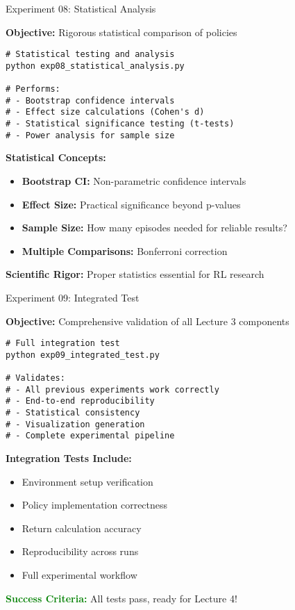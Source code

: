 \documentclass[aspectratio=169,10pt]{beamer}
\begin{document}
\begin{frame}[fragile]{Experiment 08: Statistical Analysis}

\textbf{Objective:} Rigorous statistical comparison of policies

\begin{lstlisting}
# Statistical testing and analysis
python exp08_statistical_analysis.py

# Performs:
# - Bootstrap confidence intervals
# - Effect size calculations (Cohen's d)
# - Statistical significance testing (t-tests)
# - Power analysis for sample size
\end{lstlisting}

\vfill

\textbf{Statistical Concepts:}
\begin{itemize}
    \item \textbf{Bootstrap CI:} Non-parametric confidence intervals
    \item \textbf{Effect Size:} Practical significance beyond p-values
    \item \textbf{Sample Size:} How many episodes needed for reliable results?
    \item \textbf{Multiple Comparisons:} Bonferroni correction
\end{itemize}

\vfill

\textbf{Scientific Rigor:} Proper statistics essential for RL research

\end{frame}

\begin{frame}[fragile]{Experiment 09: Integrated Test}

\textbf{Objective:} Comprehensive validation of all Lecture 3 components

\begin{lstlisting}
# Full integration test
python exp09_integrated_test.py

# Validates:
# - All previous experiments work correctly
# - End-to-end reproducibility 
# - Statistical consistency
# - Visualization generation
# - Complete experimental pipeline
\end{lstlisting}

\vfill

\textbf{Integration Tests Include:}
\begin{itemize}
    \item Environment setup verification
    \item Policy implementation correctness
    \item Return calculation accuracy
    \item Reproducibility across runs
    \item Full experimental workflow
\end{itemize}

\vfill

\textcolor{green}{\textbf{Success Criteria:}} All tests pass, ready for Lecture 4!

\end{frame}
\end{document}

